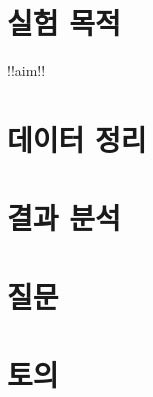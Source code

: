 \section{실험 목적}
    !!aim!!
\section{데이터 정리}
    
\section{결과 분석}
    
\section{질문}
    
\section{토의}
    